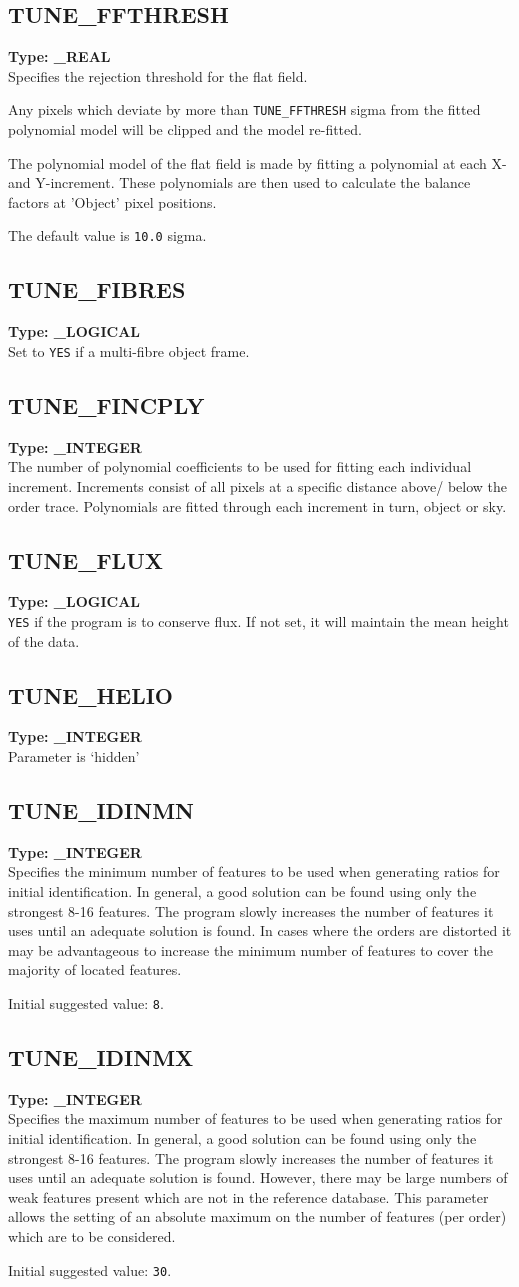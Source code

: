 \documentclass[11pt,twoside]{article}
\makeatletter
\newcommand{\xlabel}[1]{}
\newcommand{\sunspec}[2]{#1}
\renewcommand{\sunspec}[2]{#2}
\newcommand{\indexcmdname}[1]{\index{#1@\protect\cmdname{#1}}}
\renewcommand{\indexcmdname}[1]{}
\newcommand{\cmdname}{\begingroup \catcode`\_=12 \realcmdname}
\newcommand{\realcmdname}[1]{\endgroup\texttt{#1}}
\newcommand{\echparameter}[4]
{
\item [#1 = #3] \mbox{}\label{par_#2}\indexcmdname{#2}
\\
#4
}
\renewcommand{\echparameter}[4]
{
  \subsection{\xlabel{par_#2}\label{par_#2}{\bf #1}}
  {\bf Type: #3}\\
#4
}
\makeatother
\begin{document}
\echparameter{TUNE\_FFTHRESH}{TUNE_FFTHRESH}{
 \_REAL
}{
 Specifies the rejection threshold for the flat field.

 Any pixels which deviate by more than {\tt TUNE\_FFTHRESH} sigma from the
 fitted polynomial model will be clipped and the model re-fitted.

 The polynomial model of the flat field is made by fitting a polynomial
 at each X- and Y-increment.  These polynomials are then used to
 calculate the balance factors at 'Object' pixel positions.

 The default value is \texttt{10.0} sigma.
}

\echparameter{TUNE\_FIBRES}{TUNE_FIBRES}{
 \_LOGICAL
}{
 Set to \texttt{YES} if a multi-fibre object frame.
}

\echparameter{TUNE\_FINCPLY}{TUNE_FINCPLY}{
 \_INTEGER
}{
 The number of polynomial coefficients to be used for fitting each
 individual increment.  Increments consist of all pixels at a
 specific distance above/ below the order trace.  Polynomials are
 fitted through each increment in turn, object or sky.
}

\echparameter{TUNE\_FLUX}{TUNE_FLUX}{
 \_LOGICAL
}{
 \texttt{YES} if the program is to conserve flux.  If not set,
 it will maintain the mean height of the data.
}

\echparameter{TUNE\_HELIO}{TUNE_HELIO}{
 \_INTEGER
}{
 Parameter is `hidden'
}

\echparameter{TUNE\_IDINMN}{TUNE_IDINMN}{
 \_INTEGER
}{
 Specifies the minimum number of features to be used when generating
 ratios for initial identification.  In general, a good solution can
 be found using only the strongest 8\sunspec{--}{-}16 features.  The program
 slowly increases the number of features it uses until an adequate
 solution is found.  In cases where the orders are distorted it may
 be advantageous to increase the minimum number of features to cover
 the majority of located features.

 Initial suggested value: \texttt{8}.
}

\echparameter{TUNE\_IDINMX}{TUNE_IDINMX}{
 \_INTEGER
}{
 Specifies the maximum number of features to be used when generating
 ratios for initial identification.  In general, a good solution can
 be found using only the strongest 8\sunspec{--}{-}16 features.  The program
 slowly increases the number of features it uses until an adequate
 solution is found.  However, there may be large numbers of weak
 features present which are not in the reference database.  This
 parameter allows the setting of an absolute maximum on the number
 of features (per order) which are to be considered.

 Initial suggested value: \texttt{30}.
}
\end{document}
